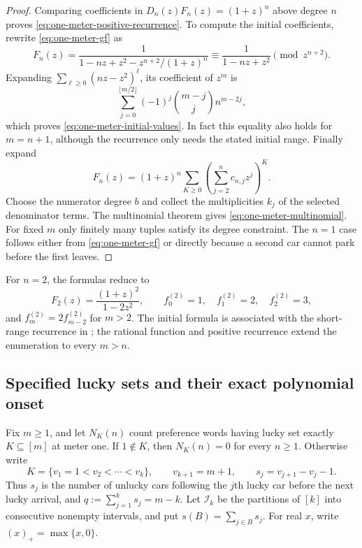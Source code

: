 \documentclass[11pt,a4paper]{article}
\begin{document}
\begin{proof}
Comparing coefficients in $D_n(z)F_n(z)=(1+z)^n$ above degree $n$
proves \eqref{eq:one-meter-positive-recurrence}.
To compute the initial coefficients, rewrite
\eqref{eq:one-meter-gf} as
\[
 F_n(z)=
 \frac1{1-nz+z^2-z^{n+2}/(1+z)^n}
 \equiv\frac1{1-nz+z^2}\pmod{z^{n+2}}.
\]
Expanding $\sum_{\ell\geq0}(nz-z^2)^\ell$, its coefficient of $z^m$ is
\[
 \sum_{j=0}^{\lfloor m/2\rfloor}
 (-1)^j\binom{m-j}{j}n^{m-2j},
\]
which proves \eqref{eq:one-meter-initial-values}. In fact this equality
also holds for $m=n+1$, although the recurrence only needs the stated
initial range. Finally expand
\[
 F_n(z)=(1+z)^n
 \sum_{K\geq0}\left(\sum_{j=2}^{n}c_{n,j}z^j\right)^K.
\]
Choose the numerator degree $b$ and collect the multiplicities $k_j$ of
the selected denominator terms. The multinomial theorem gives
\eqref{eq:one-meter-multinomial}. For fixed $m$ only finitely many tuples
satisfy its degree constraint. The $n=1$ case follows either from
\eqref{eq:one-meter-gf} or directly because a second car cannot park
before the first leaves.
\end{proof}

\begin{remark}
For $n=2$, the formulas reduce to
\[
 F_2(z)=\frac{(1+z)^2}{1-2z^2},\qquad
 f_0^{(2)}=1,\quad f_1^{(2)}=2,\quad f_2^{(2)}=3,
\]
and $f_m^{(2)}=2f_{m-2}^{(2)}$ for $m>2$.
The initial formula is associated with the short-range recurrence in \cite{DH}; the rational function
and positive recurrence extend the enumeration to every $m>n$.
\end{remark}

\subsection{Specified lucky sets and their exact polynomial onset}

Fix $m\geq1$, and let $N_K(n)$ count preference words having lucky set
exactly $K\subseteq[m]$ at meter one. If $1\notin K$, then $N_K(n)=0$
for every $n\geq1$. Otherwise write
\[
 K=\{v_1=1<v_2<\cdots<v_k\},\qquad
 v_{k+1}=m+1,\qquad s_j=v_{j+1}-v_j-1.
\]
Thus $s_j$ is the number of unlucky cars following the $j$th lucky car
before the next lucky arrival, and
$q:=\sum_{j=1}^ks_j=m-k$.
Let $\mathcal I_k$ be the partitions of $[k]$ into consecutive nonempty
intervals, and put $s(B)=\sum_{j\in B}s_j$.
For real $x$, write $(x)_+=\max\{x,0\}$.
\end{document}
